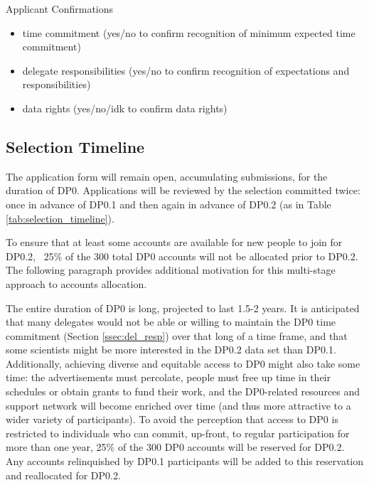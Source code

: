 \documentclass[DM,lsstdraft,authoryear,toc]{lsstdoc}
\begin{document}
Applicant Confirmations
\begin{itemize}
\item time commitment (yes/no to confirm recognition of minimum expected time commitment)
\item delegate responsibilities (yes/no to confirm recognition of expectations and responsibilities)
\item data rights (yes/no/idk to confirm data rights)
\end{itemize}


\subsection{Selection Timeline}\label{ssec:sel_time}

The application form will remain open, accumulating submissions, for the duration of DP0.
Applications will be reviewed by the selection committed twice: once in advance of DP0.1 and then again in advance of DP0.2 (as in Table \ref{tab:selection_timeline}).

To ensure that at least some accounts are available for new people to join for DP0.2, ~25\% of the 300 total DP0 accounts will not be allocated prior to DP0.2.
The following paragraph provides additional motivation for this multi-stage approach to accounts allocation.

The entire duration of DP0 is long, projected to last 1.5-2 years.
It is anticipated that many delegates would not be able or willing to maintain the DP0 time commitment (Section \ref{ssec:del_resp}) over that long of a time frame, and that some scientists might be more interested in the DP0.2 data set than DP0.1.
Additionally, achieving diverse and equitable access to DP0 might also take some time: the advertisements must percolate, people must free up time in their schedules or obtain grants to fund their work, and the DP0-related resources and support network will become enriched over time (and thus more attractive to a wider variety of participants).
To avoid the perception that access to DP0 is restricted to individuals who can commit, up-front, to regular participation for more than one year, 25\% of the 300 DP0 accounts will be reserved for DP0.2.
Any accounts relinquished by DP0.1 participants will be added to this reservation and reallocated for DP0.2.
\end{document}
